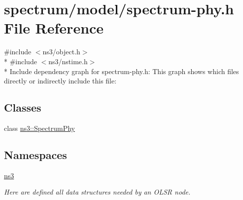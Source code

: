 \hypertarget{spectrum-phy_8h}{}\section{spectrum/model/spectrum-\/phy.h File Reference}
\label{spectrum-phy_8h}
{\ttfamily \#include $<$ns3/object.\+h$>$}\\*
{\ttfamily \#include $<$ns3/nstime.\+h$>$}\\*
Include dependency graph for spectrum-\/phy.h\+:
This graph shows which files directly or indirectly include this file\+:
\subsection*{Classes}
\begin{DoxyCompactItemize}
\item 
class \hyperlink{classns3_1_1SpectrumPhy}{ns3\+::\+Spectrum\+Phy}
\end{DoxyCompactItemize}
\subsection*{Namespaces}
\begin{DoxyCompactItemize}
\item 
 \hyperlink{namespacens3}{ns3}
\begin{DoxyCompactList}\small\item\em Here are defined all data structures needed by an O\+L\+SR node. \end{DoxyCompactList}\end{DoxyCompactItemize}
